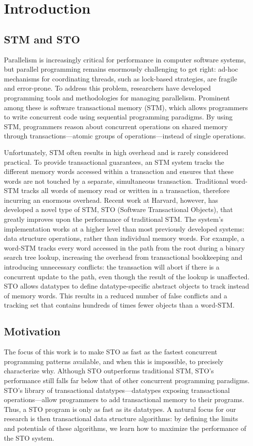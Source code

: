 \chapter{Introduction}
\section{STM and STO}
Parallelism is increasingly critical for performance in computer software systems, but parallel programming remains enormously challenging to get right: ad-hoc mechanisms for coordinating threads, such as lock-based strategies, are fragile and error-prone. To address this problem, researchers have developed programming tools and methodologies for managing parallelism. Prominent among these is software transactional memory (STM), which allows programmers to write concurrent code using sequential programming paradigms. By using STM, programmers reason about concurrent operations on shared memory through transactions---atomic groups of operations---instead of single operations. 

Unfortunately, STM often results in high overhead and is rarely considered practical. To provide transactional guarantees, an STM system tracks the different memory words accessed within a transaction and ensures that these words are not touched by a separate, simultaneous transaction. Traditional word-STM tracks all words of memory read or written in a transaction, therefore incurring an enormous overhead\cite{cascaval}. Recent work at Harvard, however, has developed a novel type of STM, STO (Software Transactional Objects), that greatly improves upon the performance of traditional STM\cite{sto}. The system's implementation works at a higher level than most previously developed systems: data structure operations, rather than individual memory words. For example, a word-STM tracks every word accessed in the path from the root during a binary search tree lookup, increasing the overhead from transactional bookkeeping and introducing unnecessary conflicts: the transaction will abort if there is a concurrent update to the path, even though the result of the lookup is unaffected. STO allows datatypes to define datatype-specific abstract objects to track instead of memory words. This results in a reduced number of false conflicts and a tracking set that contains hundreds of times fewer objects than a word-STM. 

\section{Motivation}
The focus of this work is to make STO as fast as the fastest concurrent programming patterns available, and when this is impossible, to precisely characterize why. Although STO outperforms traditional STM, STO’s performance still falls far below that of other concurrent programming paradigms. STO’s library of transactional datatypes---datatypes exposing transactional operations---allow programmers to add transactional memory to their programs. Thus, a STO program is only as fast as its datatypes. A natural focus for our research is then transactional data structure algorithms: by defining the limits and potentials of these algorithms, we learn how to maximize the performance of the STO system.


